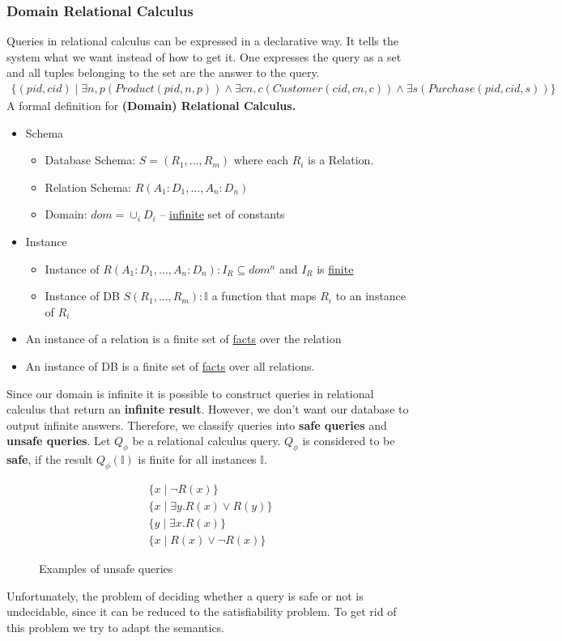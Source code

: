 \subsubsection{Domain Relational Calculus}
Queries in relational calculus can be expressed in a declarative way. It tells the system what we want instead of how to get it. One expresses the query as a set and all tuples belonging to the set are the answer to the query. 
\begin{align*}
\{(pid, cid) \mid \exists n, p (Product(pid, n, p)) \land \exists cn, c (Customer(cid, cn, c)) \land \exists s (Purchase(pid, cid, s))\}
\end{align*}
A formal definition for \textbf{(Domain) Relational Calculus.}
\begin{itemize}
\item Schema
\begin{itemize}
\item Database Schema: $S = (R_1, ..., R_m)$ where each $R_i$ is a Relation.
\item Relation Schema: $R(A_1 : D_1, ..., A_n : D_n)$
\item Domain: $dom = \cup_i D_i$ -- \underline{infinite} set of constants
\end{itemize}
\item Instance
\begin{itemize}
\item Instance of $R(A_1:D_1, ..., A_n:D_n) : I_R \subseteq dom^n$ and $I_R$ is \underline{finite}
\item Instance of DB $S(R_1,...,R_m): \mathbb{I}$ a function that maps $R_i$ to an instance of $R_i$
\end{itemize}
\item An instance of a relation is a finite set of \underline{facts} over the relation
\item An instance of DB is a finite set of \underline{facts} over all relations.
\end{itemize}

Since our domain is infinite it is possible to construct queries in relational calculus that return an \textbf{infinite result}. However, we don't want our database to output infinite answers. Therefore, we classify queries into \textbf{safe queries} and \textbf{unsafe queries}. Let $Q_\phi$ be a relational calculus query. $Q_\phi$ is considered to be \textbf{safe}, if the result $Q_\phi(\mathbb{I})$ is finite for all instances $\mathbb{I}$. 
\begin{figure}[H]
\begin{align*}
\{x \mid \neg R(x)\} \\
\{x \mid \exists y. R(x) \lor R(y)\} \\
\{y \mid \exists x. R(x)\} \\
\{x \mid R(x) \lor \neg R(x)\}
\end{align*}
\caption{Examples of unsafe queries}
\end{figure}
Unfortunately, the problem of deciding whether a query is safe or not is undecidable, since it can be reduced to the satisfiability problem. To get rid of this problem we try to adapt the semantics.

